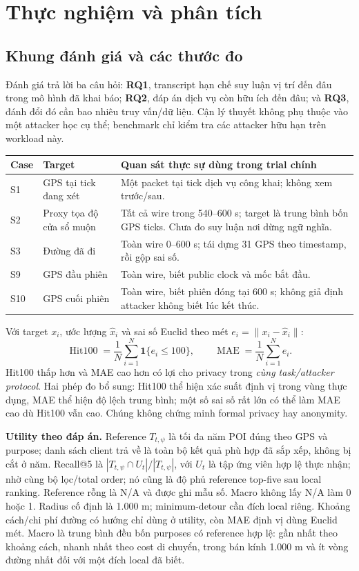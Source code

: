 \chapter{Thực nghiệm và phân tích}\label{ch:experiments}
\section{Khung đánh giá và các thước đo}
Đánh giá trả lời ba câu hỏi: \textbf{RQ1}, transcript hạn chế suy luận vị trí đến đâu trong mô hình đã khai báo;
\textbf{RQ2}, đáp án dịch vụ còn hữu ích đến đâu; và \textbf{RQ3}, đánh đổi đó cần bao nhiêu truy vấn/dữ liệu.
Cận lý thuyết không phụ thuộc vào một attacker học cụ thể; benchmark chỉ kiểm tra các attacker hữu hạn trên workload này.

\noindent\begin{tabularx}{\linewidth}{@{}P{1cm}P{4.1cm}Y@{}}\toprule
\textbf{Case} & \textbf{Target} & \textbf{Quan sát thực sự dùng trong trial chính}\\\midrule
S1 & GPS tại tick đang xét & Một packet tại tick dịch vụ công khai; không xem trước/sau.\\
S2 & Proxy tọa độ cửa sổ muộn & Tất cả wire trong 540--600 s; target là trung bình bốn GPS ticks. Chưa đo suy luận nơi dừng ngữ nghĩa.\\
S3 & Đường đã đi & Toàn wire 0--600 s; tái dựng 31 GPS theo timestamp, rồi gộp sai số.\\
S9 & GPS đầu phiên & Toàn wire, biết public clock và mốc bắt đầu.\\
S10 & GPS cuối phiên & Toàn wire, biết phiên đóng tại 600 s; không giả định attacker không biết lúc kết thúc.\\\bottomrule
\end{tabularx}

Với target $x_i$, ước lượng $\hat x_i$ và sai số Euclid theo mét $e_i=\|x_i-\hat x_i\|$:
\[
\operatorname{Hit100}=\frac1N\sum_{i=1}^N\mathbf1\{e_i\le100\},\qquad
\operatorname{MAE}=\frac1N\sum_{i=1}^Ne_i.
\]
Hit100 thấp hơn và MAE cao hơn có lợi cho privacy trong \emph{cùng task/attacker protocol}. Hai phép đo bổ sung:
Hit100 thể hiện xác suất định vị trong vùng thực dụng, MAE thể hiện độ lệch trung bình; một số sai số rất lớn
có thể làm MAE cao dù Hit100 vẫn cao. Chúng không chứng minh formal privacy hay anonymity.

\textbf{Utility theo đáp án.} Reference $T_{t,\psi}$ là tối đa năm POI đúng theo GPS và purpose; danh sách client
trả về là toàn bộ kết quả phù hợp đã sắp xếp, không bị cắt ở năm. Recall@5 là
$|T_{t,\psi}\cap U_t|/|T_{t,\psi}|$, với $U_t$ là tập ứng viên hợp lệ thực nhận; nhờ cùng bộ lọc/total order; nó cũng là độ phủ reference top-five sau local ranking. Reference rỗng là N/A và được ghi mẫu số. Macro không lấy N/A làm 0 hoặc 1. Radius cố định là 1.000 m;
minimum-detour cần đích local riêng. Khoảng cách/chi phí đường có hướng chỉ dùng ở utility, còn MAE định vị dùng Euclid mét.
Macro là trung bình đều bốn purposes có reference hợp lệ: gần nhất theo khoảng cách, nhanh nhất theo cost
di chuyển, trong bán kính 1.000 m và ít vòng đường nhất đối với một đích local đã biết.


